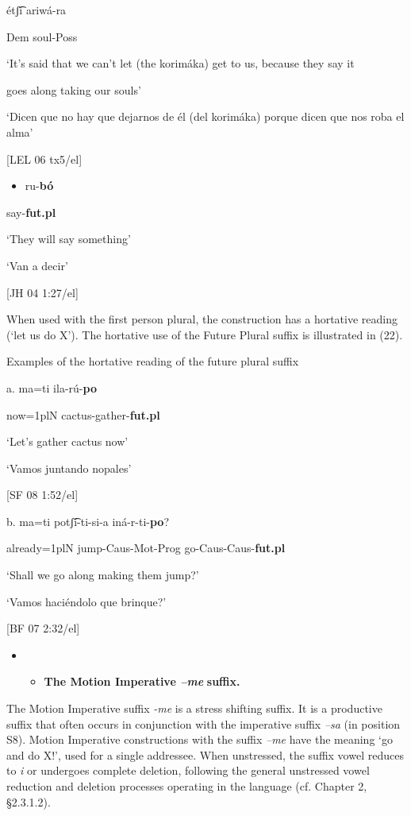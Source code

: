 étʃ͡i   ariwá-ra

Dem   soul-Poss

    ‘It’s said that we can’t let (the korimáka) get to us, because they say it 

goes along taking our souls’

‘Dicen que no hay que dejarnos de él (del korimáka) porque dicen que nos roba el alma’            

[LEL 06 tx5/el]


\begin{itemize}
\item ru-\textbf{bó}    
\end{itemize}

say-\textbf{fut.pl}    

‘They will say something’

‘Van a decir’            

[JH 04 1:27/el]

When used with the first person plural, the construction has a hortative reading (‘let us do X’). The hortative use of the Future Plural suffix is illustrated in (22).

  Examples of the hortative reading of the future plural suffix

a.   ma=ti     ila-rú-\textbf{po}

now=1plN  cactus-gather-\textbf{fut.pl}

‘Let’s gather cactus now’

    ‘Vamos juntando nopales’        

    [SF 08 1:52/el]

b.    ma=ti    potʃ͡í-ti-si-a     iná-r-ti-\textbf{po}?  

already=1plN  jump-Caus-Mot-Prog  go-Caus-Caus-\textbf{fut.pl}

‘Shall we go along making them jump?’

‘Vamos haciéndolo que brinque?’      

[BF 07 2:32/el]


\begin{itemize}
\item \begin{itemize}
\item \textbf{The Motion Imperative \textit{–me} }\textbf{suffix.}
\end{itemize}
\end{itemize}

The Motion Imperative suffix \textit{{}-me} is a stress shifting suffix. It is a productive suffix that often occurs in conjunction with the imperative suffix \textit{–sa} (in position S8). Motion Imperative constructions with the suffix \textit{–me} have the meaning ‘go and do X!’, used for a single addressee. When unstressed, the suffix vowel reduces to \textit{i} or undergoes complete deletion, following the general unstressed vowel reduction and deletion processes operating in the language (cf. Chapter 2, §2.3.1.2).

